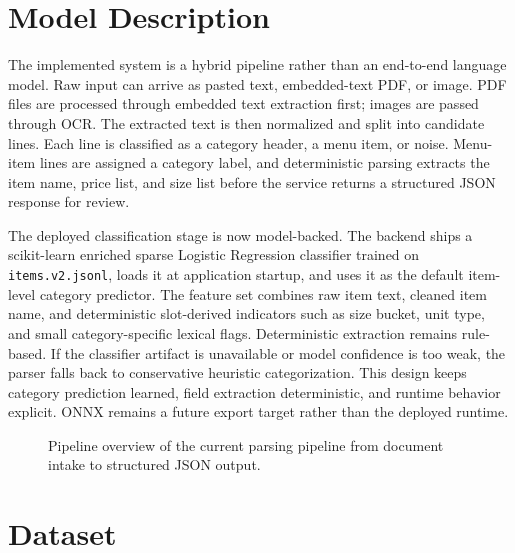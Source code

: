 \documentclass{article}
\begin{document}
\section{Model Description}

The implemented system is a hybrid pipeline rather than an end-to-end language
model. Raw input can arrive as pasted text, embedded-text PDF, or image. PDF
files are processed through embedded text extraction first; images are passed
through OCR. The extracted text is then normalized and split into candidate
lines. Each line is classified as a category header, a menu item, or noise.
Menu-item lines are assigned a category label, and deterministic parsing
extracts the item name, price list, and size list before the service returns a
structured JSON response for review.

The deployed classification stage is now model-backed. The backend ships a
scikit-learn enriched sparse Logistic Regression classifier trained on
\texttt{items.v2.jsonl}, loads it at application startup, and uses it as the
default item-level category predictor. The feature set combines raw item text,
cleaned item name, and deterministic slot-derived indicators such as size
bucket, unit type, and small category-specific lexical flags. Deterministic
extraction remains rule-based. If the classifier artifact is unavailable or
model confidence is too weak, the parser falls back to conservative heuristic
categorization. This design keeps category prediction learned, field
extraction deterministic, and runtime behavior explicit. ONNX remains a future
export target rather than the deployed runtime.

\begin{figure}[t]
\centering
{}
\caption{Pipeline overview of the current parsing pipeline from document intake to structured JSON output.}
\label{fig:pipeline}
\end{figure}

\section{Dataset}
\end{document}
